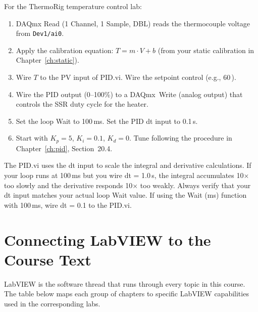 \begin{examplebox}
For the ThermoRig temperature control lab:
\begin{enumerate}[nosep,leftmargin=1.5em]
\item DAQmx Read (1 Channel, 1 Sample, DBL) reads the thermocouple voltage from \texttt{Dev1/ai0}.
\item Apply the calibration equation: $T = m \cdot V + b$ (from your static calibration in Chapter~\ref{ch:static}).
\item Wire $T$ to the PV input of PID.vi. Wire the setpoint control (e.g., 60\,\degC{}).
\item Wire the PID output (0--100\%) to a DAQmx~Write (analog output) that controls the SSR duty cycle for the heater.
\item Set the loop Wait to 100\,ms. Set the PID dt input to 0.1\,s.
\item Start with $K_p = 5$, $K_i = 0.1$, $K_d = 0$. Tune following the procedure in Chapter~\ref{ch:pid}, Section~20.4.
\end{enumerate}
\end{examplebox}

\begin{warningbox}
The PID.vi uses the dt input to scale the integral and derivative calculations. If your loop runs at 100\,ms but you wire dt = 1.0\,s, the integral accumulates 10$\times$ too slowly and the derivative responds 10$\times$ too weakly. Always verify that your dt input matches your actual loop Wait value. If using the Wait (ms) function with 100\,ms, wire dt = 0.1 to the PID.vi.
\end{warningbox}

\section{Connecting LabVIEW to the Course Text}
\label{sec:lv_course_map}

LabVIEW is the software thread that runs through every topic in this course. The table below maps each group of chapters to specific LabVIEW capabilities used in the corresponding labs.


